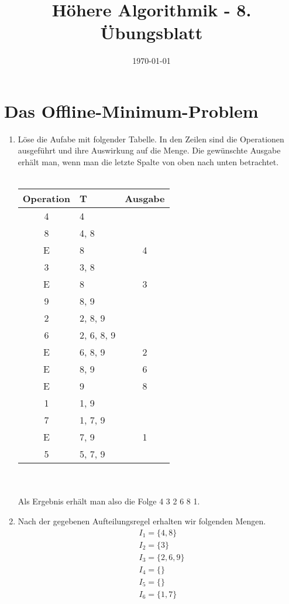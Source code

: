 \documentclass[a4paper,10pt]{article}
\title{H\"ohere Algorithmik - 8. \"Ubungsblatt}
\author{\Authors}
\date{\today}
\begin{document}
\maketitle

\section{Das Offline-Minimum-Problem}
\begin{enumerate}
\item  Löse die Aufabe mit folgender Tabelle. In den Zeilen sind die Operationen ausgeführt und ihre Auswirkung auf die Menge. Die gewünschte Ausgabe erhält man, wenn man die letzte Spalte von oben nach unten betrachtet.\\ \\
	\begin{tabular}{ c | l | c }
	\textbf{Operation} & \textbf{T} & \textbf{Ausgabe} \\
	\hline
	4 & 4 & \\
	\hline
	8 & 4, 8 & \\
	\hline
	E & 8 & 4 \\
	\hline
	3 & 3, 8 & \\
	\hline
	E & 8 & 3 \\
	\hline
	9 & 8, 9 & \\
	\hline
	2 & 2, 8, 9 & \\
	\hline
	6 & 2, 6, 8, 9 & \\
	\hline
	E & 6, 8, 9 & 2 \\
	\hline
	E & 8, 9 & 6 \\
	\hline
	E & 9 & 8 \\
	\hline
	1 & 1, 9 & \\
	\hline
	7 & 1, 7, 9 & \\
	\hline
	E & 7, 9 & 1 \\
	\hline
	5 & 5, 7, 9 & \\
	\hline
	\end{tabular}\\ \\
	Als Ergebnis erhält man also die Folge 4 3 2 6 8 1.
\item   Nach der gegebenen Aufteilungsregel erhalten wir folgenden Mengen.\begin{align*}
	&I_1 = \{4, 8\}\\
	&I_2 = \{3\}\\
	&I_3 =\{2, 6, 9\}\\
	&I_4 = \{\} \\
	&I_5 = \{\}\\
	&I_6 = \{1, 7\}\\

\end{align*}
\end{enumerate}
\end{document}
